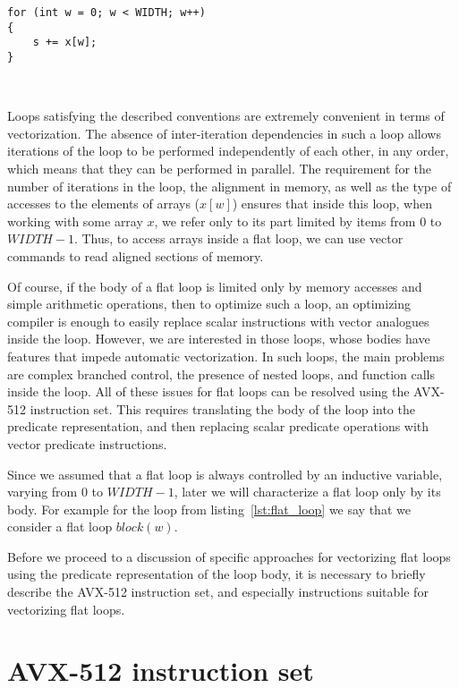 \documentclass[
11pt,%
tightenlines,%
twoside,%
onecolumn,%
nofloats,%
nobibnotes,%
nofootinbib,%
superscriptaddress,%
noshowpacs,%
centertags]%
{revtex4}
\begin{document}
\begin{lstlisting}[caption={Simple example of a non-flat loop.},label={lst:not_flat_loop}]
for (int w = 0; w < WIDTH; w++)
{
    s += x[w];
}
\end{lstlisting}

\

Loops satisfying the described conventions are extremely convenient in terms of vectorization.
The absence of inter-iteration dependencies in such a loop allows iterations of the loop to be performed independently of each other, in any order, which means that they can be performed in parallel.
The requirement for the number of iterations in the loop, the alignment in memory, as well as the type of accesses to the elements of arrays ($x[w]$) ensures that inside this loop, when working with some array $x$, we refer only to its part limited by items from $0$ to $WIDTH - 1$.
Thus, to access arrays inside a flat loop, we can use vector commands to read aligned sections of memory.

Of course, if the body of a flat loop is limited only by memory accesses and simple arithmetic operations, then to optimize such a loop, an optimizing compiler is enough to easily replace scalar instructions with vector analogues inside the loop.
However, we are interested in those loops, whose bodies have features that impede automatic vectorization.
In such loops, the main problems are complex branched control, the presence of nested loops, and function calls inside the loop.
All of these issues for flat loops can be resolved using the AVX-512 instruction set.
This requires translating the body of the loop into the predicate representation, and then replacing scalar predicate operations with vector predicate instructions.

Since we assumed that a flat loop is always controlled by an inductive variable, varying from $0$ to $WIDTH - 1$, later we will characterize a flat loop only by its body.
For example for the loop from listing~\ref{lst:flat_loop} we say that we consider a flat loop $block(w)$.

Before we proceed to a discussion of specific approaches for vectorizing flat loops using the predicate representation of the loop body, it is necessary to briefly describe the AVX-512 instruction set, and especially instructions suitable for vectorizing flat loops.

\section{AVX-512 instruction set}
\end{document}
